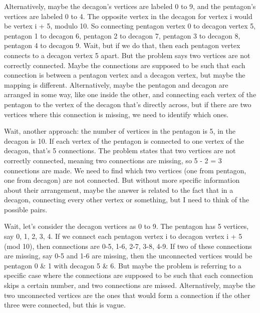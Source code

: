 Alternatively, maybe the decagon's vertices are labeled 0 to 9, and the pentagon's vertices are labeled 0 to 4. The opposite vertex in the decagon for vertex i would be vertex i + 5, modulo 10. So connecting pentagon vertex 0 to decagon vertex 5, pentagon 1 to decagon 6, pentagon 2 to decagon 7, pentagon 3 to decagon 8, pentagon 4 to decagon 9. Wait, but if we do that, then each pentagon vertex connects to a decagon vertex 5 apart. But the problem says two vertices are not correctly connected. Maybe the connections are supposed to be such that each connection is between a pentagon vertex and a decagon vertex, but maybe the mapping is different. Alternatively, maybe the pentagon and decagon are arranged in some way, like one inside the other, and connecting each vertex of the pentagon to the vertex of the decagon that's directly across, but if there are two vertices where this connection is missing, we need to identify which ones.

Wait, another approach: the number of vertices in the pentagon is 5, in the decagon is 10. If each vertex of the pentagon is connected to one vertex of the decagon, that's 5 connections. The problem states that two vertices are not correctly connected, meaning two connections are missing, so 5 - 2 = 3 connections are made. We need to find which two vertices (one from pentagon, one from decagon) are not connected. But without more specific information about their arrangement, maybe the answer is related to the fact that in a decagon, connecting every other vertex or something, but I need to think of the possible pairs.

Wait, let's consider the decagon vertices as 0 to 9. The pentagon has 5 vertices, say 0, 1, 2, 3, 4. If we connect each pentagon vertex i to decagon vertex i + 5 (mod 10), then connections are 0-5, 1-6, 2-7, 3-8, 4-9. If two of these connections are missing, say 0-5 and 1-6 are missing, then the unconnected vertices would be pentagon 0 & 1 with decagon 5 & 6. But maybe the problem is referring to a specific case where the connections are supposed to be such that each connection skips a certain number, and two connections are missed. Alternatively, maybe the two unconnected vertices are the ones that would form a connection if the other three were connected, but this is vague.

